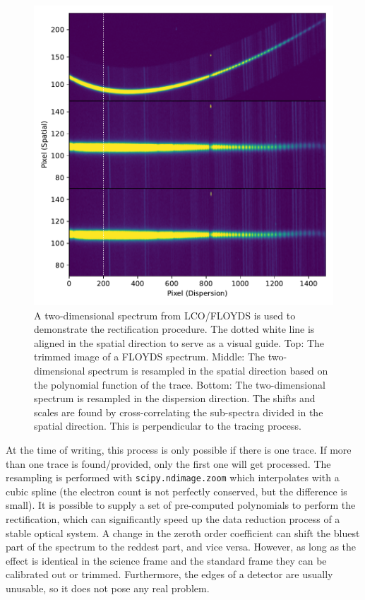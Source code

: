 \documentclass[linenumbers, twocolumn]{aastex631}
\begin{document}
\begin{figure}
    \centering
    \includegraphics[width=\columnwidth]{fig_02_rectification.pdf}
    \caption{A two-dimensional spectrum from LCO/FLOYDS is used to demonstrate
    the rectification procedure. The dotted white line is aligned in the
    spatial direction to serve as a visual guide. Top: The trimmed image of a
    FLOYDS spectrum. Middle: The two-dimensional spectrum is resampled in the
    spatial direction based on the polynomial function of the trace. Bottom:
    The two-dimensional spectrum is resampled in the dispersion direction. The
    shifts and scales are found by cross-correlating the sub-spectra divided in
    the spatial direction. This is perpendicular to the tracing process.}
    \label{fig:rectify}
\end{figure}

At the time of writing, this process is only possible if there is one trace. If
more than one trace is found/provided, only the first one will get processed.
The resampling is performed with \texttt{scipy.ndimage.zoom} which interpolates
with a cubic spline (the electron count is not perfectly conserved, but the
difference is small). It is possible to supply a set of pre-computed polynomials
to perform the rectification, which can significantly speed up the data
reduction process of a stable optical system. A change in the zeroth order
coefficient can shift the bluest part of the spectrum to the reddest part, and
vice versa. However, as long as the effect is identical in the science frame
and the standard frame they can be calibrated out or trimmed. Furthermore, the
edges of a detector are usually unusable, so it does not pose any real problem.
\end{document}
